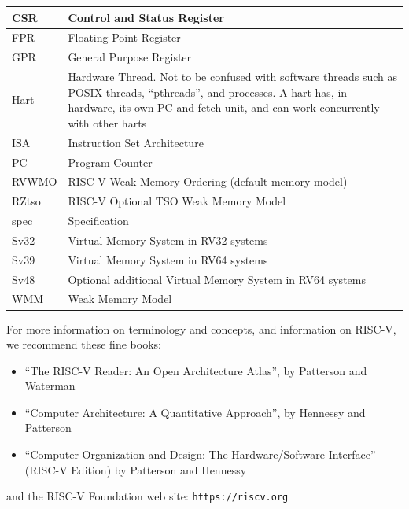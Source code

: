 \documentclass[11pt]{article}
\begin{document}
\begin{tabular}{|l|p{4.5in}|}
\hline
CSR   & Control and Status Register \\
\hline
FPR   & Floating Point Register \\
\hline
GPR   & General Purpose Register \\
\hline
Hart  & Hardware Thread.  Not to be confused with software threads
         such as POSIX threads, ``pthreads'', and processes.
	 A hart has, in hardware, its own PC and fetch unit,
	 and can work concurrently with other harts \\
\hline
ISA   & Instruction Set Architecture \\
\hline
PC    & Program Counter \\
\hline
RVWMO & RISC-V Weak Memory Ordering (default memory model) \\
\hline
RZtso & RISC-V Optional TSO Weak Memory Model \\
\hline
spec  & Specification \\
\hline
Sv32  & Virtual Memory System in RV32 systems \\
\hline
Sv39  & Virtual Memory System in RV64 systems \\
\hline
Sv48  & Optional additional Virtual Memory System in RV64 systems \\
\hline
WMM  & Weak Memory Model \\
\hline
\end{tabular}

\vspace*{1cm}

For more information on terminology and concepts, and information on RISC-V, we recommend these fine books:

\begin{itemize}
\item
``The RISC-V Reader: An Open Architecture Atlas'', by Patterson and Waterman~\cite{Patterson2017b}

\item
``Computer Architecture: A Quantitative Approach'', by Hennessy and Patterson~\cite{Hennessy2017}

\item
``Computer Organization and Design: The Hardware/Software Interface'' (RISC-V Edition) by
     Patterson and Hennessy~\cite{Patterson2017a}
\end{itemize}

and the RISC-V Foundation web site: \verb|https://riscv.org|

\end{document}
